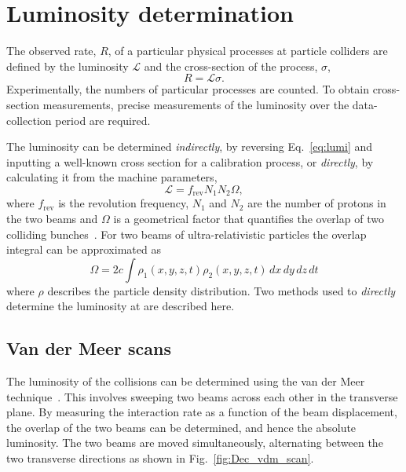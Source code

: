 \section{Luminosity determination}
The observed rate, $R$, of a particular physical processes at particle colliders are defined by the luminosity $\mathcal{L}$ and the cross-section of the process, $\sigma$, 
\begin{equation}
R = \mathcal{L}\sigma.
\label{eq:lumi}
\end{equation}
Experimentally, the numbers of particular processes are counted. To obtain cross-section measurements, precise measurements of the luminosity over the data-collection period are required.

The luminosity can be determined \emph{indirectly}, by reversing Eq.~\ref{eq:lumi} and inputting a well-known cross section for a calibration process, or \emph{directly}, by calculating it from the machine parameters,
\begin{equation}
\mathcal{L} = f_{\text{rev}}N_{1}N_{2}\Omega,
\end{equation}
where $f_{\text{rev}}$ is the revolution frequency, $N_{1}$ and $N_{2}$ are the number of protons in the two beams and $\Omega$ is a geometrical factor that quantifies the overlap of two colliding bunches~\cite{1748-0221-9-12-P12005}. 
For two beams of ultra-relativistic particles the overlap integral can be approximated as 
\begin{equation}
\Omega = 2c\int \rho_{1}(x,y,z,t)\rho_{2}(x,y,z,t)\,dx\,dy\,dz\,dt 
\end{equation}
where $\rho$ describes the particle density distribution.
Two methods used to \emph{directly} determine the luminosity at \lhcb are described here.



\subsection{Van der Meer scans}

The luminosity of the collisions can be determined using the van der Meer technique~\cite{VanDerMeer}. This involves sweeping two beams across each other in the transverse plane. By measuring the interaction rate as a function of the beam displacement, the overlap of the two beams can be determined, and hence the absolute luminosity. The two beams are moved simultaneously, alternating between the two transverse directions as shown in Fig.~\ref{fig:Dec_vdm_scan}.


